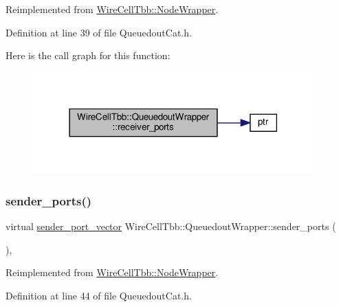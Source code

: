 Reimplemented from \hyperlink{class_wire_cell_tbb_1_1_node_wrapper_ac3c636904e4d3d1df0939906dd8853c7}{Wire\+Cell\+Tbb\+::\+Node\+Wrapper}.



Definition at line 39 of file Queuedout\+Cat.\+h.

Here is the call graph for this function\+:
\nopagebreak
\begin{figure}[H]
\begin{center}
\leavevmode
\includegraphics[width=306pt]{class_wire_cell_tbb_1_1_queuedout_wrapper_ad834a6bf647b8ee3126b868f7f37c80f_cgraph}
\end{center}
\end{figure}
\mbox{\label{class_wire_cell_tbb_1_1_queuedout_wrapper_a3fbda43473c83b36b82fc53de70a9018}} 
\subsubsection{\texorpdfstring{sender\+\_\+ports()}{sender\_ports()}}
{\footnotesize\ttfamily virtual \hyperlink{namespace_wire_cell_tbb_a99272fef0f0c33dc9d4e6e8f777b2e6e}{sender\+\_\+port\+\_\+vector} Wire\+Cell\+Tbb\+::\+Queuedout\+Wrapper\+::sender\+\_\+ports (\begin{DoxyParamCaption}{ }\end{DoxyParamCaption})\hspace{0.3cm}{\ttfamily [inline]}, {\ttfamily [virtual]}}



Reimplemented from \hyperlink{class_wire_cell_tbb_1_1_node_wrapper_a4ed2daeddbb2f75934759ac8f9a3ce8b}{Wire\+Cell\+Tbb\+::\+Node\+Wrapper}.



Definition at line 44 of file Queuedout\+Cat.\+h.

